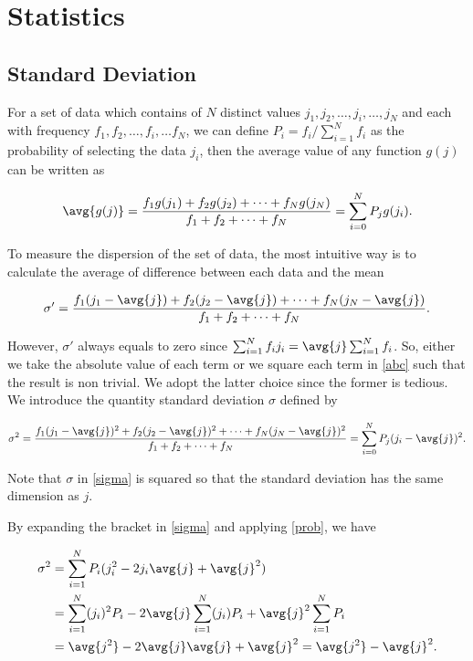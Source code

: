 \documentclass[english,a4paper,12pt]{report}
\begin{document}
\chapter{Statistics}
		
\section{Standard Deviation}

For a set of data which contains of \(N\) distinct values \(j_1, j_2, \ldots , j_i, \ldots , j_N\) and each with frequency \(f_1, f_2, \ldots , f_i, \ldots f_N\), we can define \( P_i = f_i / \sum_{i=1}^{N} f_i\) as the probability of selecting the data \(j_i\), then the average value of any function \(g(j)\) can be written as 
	
\begin{equation}
	 \avg{g(j)}  = \frac{f_1 g(j_1) + f_2 g(j_2) + \cdots + f_N g(j_N)}{f_1 + f_2 + \cdots + f_N} = \sum_{i=0}^{N} P_j g(j_i). \label{prob} 
\end{equation}
	
To measure the dispersion of the set of data, the most intuitive way is to calculate the average of difference between each data and the mean

\begin{equation} 
	\sigma' = \frac{f_1(j_1 - \avg{ j }) + f_2(j_2 - \avg{ j }) + \cdots + f_N(j_N - \avg{ j })}{f_1 + f_2 + \cdots + f_N}. \label{abc} 
\end{equation}

However, \(\sigma'\) always equals to zero since \( \sum_{i=1}^{N} f_i j_i = \avg{ j } \sum_{i=1}^{N} f_i \). So, either we take the absolute value of each term or we square each term in \cref{abc} such that the result is non trivial. We adopt the latter choice since the former is tedious. We introduce the quantity standard deviation \(\sigma\) defined by

\begin{equation} 
	\sigma^2 = \frac{f_1(j_1 - \avg{ j })^2 + f_2(j_2 - \avg{ j })^2 + \cdots + f_N(j_N - \avg{ j })^2}{f_1 + f_2 + \cdots + f_N} = \sum_{i=0}^{N} P_j (j_i - \avg{ j })^2. \label{sigma} 
\end{equation}

Note that \(\sigma\) in \cref{sigma} is squared so that the standard deviation has the same dimension as \(j\).

By expanding the bracket in \cref{sigma} and applying \cref{prob}, we have

\begin{equation} 
	\begin{aligned} 
		\sigma^2 &= \sum_{i=1}^{N} P_i (j_i^2 - 2j_i\avg{ j } + \avg{ j }^2) \\ &= \sum_{i=1}^{N} (j_i)^2 P_i - 2 \avg{ j } \sum_{i=1}^{N} (j_i) P_i + \avg{ j }^2 \sum_{i=1}^{N} P_i \\ &= \avg{ j^2 } - 2\avg{ j } \avg{ j } + \avg{ j }^2 = \avg{ j^2 } - \avg{ j }^2. 
	\end{aligned} 
\end{equation}
\end{document}
